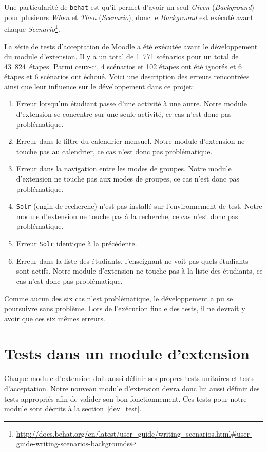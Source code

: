 Une particularité de \texttt{behat} est qu'il permet d'avoir un seul \textit{Given} (\textit{Background}) pour plusieurs \textit{When} et \textit{Then} (\textit{Scenario}), donc
le \textit{Background} est ex\'ecut\'e avant chaque \textit{Scenario}\footnote{\url{http://docs.behat.org/en/latest/user\_guide/writing\_scenarios.html\#user-guide-writing-scenarios-backgrounds}}.

La s\'erie de tests d'acceptation de Moodle a \'et\'e ex\'ecut\'ee avant le d\'eveloppement du module d'extension.
Il y a un total de 1~771 sc\'enarios pour un total de 43~824~\'etapes.
Parmi ceux-ci, 4 sc\'enarios et 102 \'etapes ont \'et\'e ignor\'es et 6 \'etapes et 6 sc\'enarios ont \'echou\'e.
Voici une description des erreurs rencontr\'ees ainsi que leur influence sur le d\'eveloppement dans ce projet:
\begin{enumerate}
  \item Erreur lorsqu'un \'etudiant passe d'une activit\'e \`a une autre.
        Notre module d'extension se concentre sur une seule activit\'e, ce cas n'est donc pas probl\'ematique.
        
  \item Erreur dans le filtre du calendrier mensuel.
        Notre module d'extension ne touche pas au calendrier, ce cas n'est donc pas probl\'ematique.
        
  \item Erreur dans la navigation entre les modes de groupes.
        Notre module d'extension ne touche pas aux modes de groupes, ce cas n'est donc pas probl\'ematique.
        
  \item \texttt{Solr} (engin de recherche) n'est pas install\'e sur l'environnement de test.
        Notre module d'extension ne touche pas \`a la recherche, ce cas n'est donc pas probl\'ematique.
        
  \item Erreur \texttt{Solr} identique \`a la pr\'ec\'edente.
  
  \item Erreur dans la liste des \'etudiants, l'enseignant ne voit pas quels \'etudiants sont actifs.
        Notre module d'extension ne touche pas \`a la liste des \'etudiants, ce cas n'est donc pas probl\'ematique.
\end{enumerate}
Comme aucun des six cas n'est probl\'ematique, le d\'eveloppement a pu se poursuivre sans probl\`eme.
Lors de l'ex\'ecution finale des tests, il ne devrait y avoir que ces six m\^emes erreurs.

\section{Tests dans un module d'extension}
Chaque module d'extension doit aussi d\'efinir ses propres tests unitaires et tests d'acceptation.
Notre nouveau module d'extension devra donc lui aussi d\'efinir des tests appropri\'es afin de valider son bon fonctionnement.
Ces tests pour notre module sont d\'ecrits \`a la section~\ref{dev_test}.
